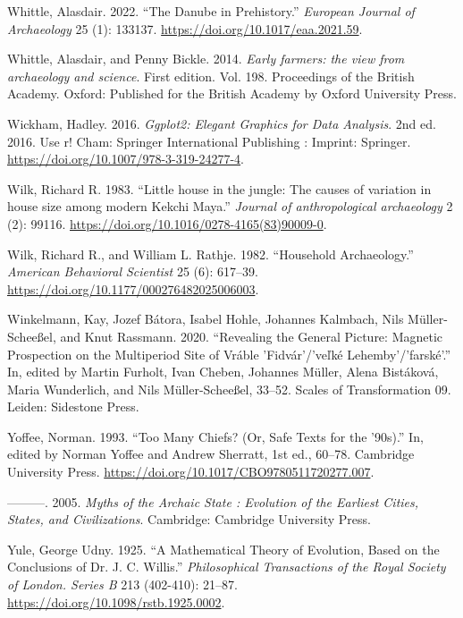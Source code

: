 \documentclass[
  12pt,
  a4paper, twoside]{book}
\newlength{\cslhangindent}
\newlength{\cslentryspacingunit} %
\newenvironment{CSLReferences}[2] %
 {%
  \setlength{\parindent}{0pt}
  \ifodd #1
  \let\oldpar\par
  \def\par{\hangindent=\cslhangindent\oldpar}
  \fi
  \setlength{\parskip}{#2\cslentryspacingunit}
 }%
 {}
\begin{document}
\begin{CSLReferences}{1}{0}
\leavevmode{}%
Whittle, Alasdair. 2022. {``The Danube in Prehistory.''} \emph{European Journal of Archaeology} 25 (1): 133137. \url{https://doi.org/10.1017/eaa.2021.59}.

\leavevmode{}%
Whittle, Alasdair, and Penny Bickle. 2014. \emph{Early farmers: the view from archaeology and science}. First edition. Vol. 198. Proceedings of the British Academy. Oxford: Published for the British Academy by Oxford University Press.

\leavevmode{}%
Wickham, Hadley. 2016. \emph{Ggplot2: Elegant Graphics for Data Analysis}. 2nd ed. 2016. Use r! Cham: Springer International Publishing : Imprint: Springer. \url{https://doi.org/10.1007/978-3-319-24277-4}.

\leavevmode{}%
Wilk, Richard R. 1983. {``Little house in the jungle: The causes of variation in house size among modern Kekchi Maya.''} \emph{Journal of anthropological archaeology} 2 (2): 99116. \url{https://doi.org/10.1016/0278-4165(83)90009-0}.

\leavevmode{}%
Wilk, Richard R., and William L. Rathje. 1982. {``Household Archaeology.''} \emph{American Behavioral Scientist} 25 (6): 617--39. \url{https://doi.org/10.1177/000276482025006003}.

\leavevmode{}%
Winkelmann, Kay, Jozef Bátora, Isabel Hohle, Johannes Kalmbach, Nils Müller-Scheeßel, and Knut Rassmann. 2020. {``Revealing the General Picture: Magnetic Prospection on the Multiperiod Site of Vráble 'Fidvár'/'ve{ľ}ké Lehemby'/'farské'.''} In, edited by Martin Furholt, Ivan Cheben, Johannes Müller, Alena Bistáková, Maria Wunderlich, and Nils Müller-Scheeßel, 33--52. Scales of Transformation 09. Leiden: Sidestone Press.

\leavevmode{}%
Yoffee, Norman. 1993. {``Too Many Chiefs? (Or, Safe Texts for the '90s).''} In, edited by Norman Yoffee and Andrew Sherratt, 1st ed., 60--78. Cambridge University Press. \url{https://doi.org/10.1017/CBO9780511720277.007}.

\leavevmode{}%
---------. 2005. \emph{Myths of the Archaic State : Evolution of the Earliest Cities, States, and Civilizations}. Cambridge: Cambridge University Press.

\leavevmode{}%
Yule, George Udny. 1925. {``A Mathematical Theory of Evolution, Based on the Conclusions of Dr. J. C. Willis.''} \emph{Philosophical Transactions of the Royal Society of London. Series B} 213 (402-410): 21--87. \url{https://doi.org/10.1098/rstb.1925.0002}.


\end{CSLReferences}
\end{document}
